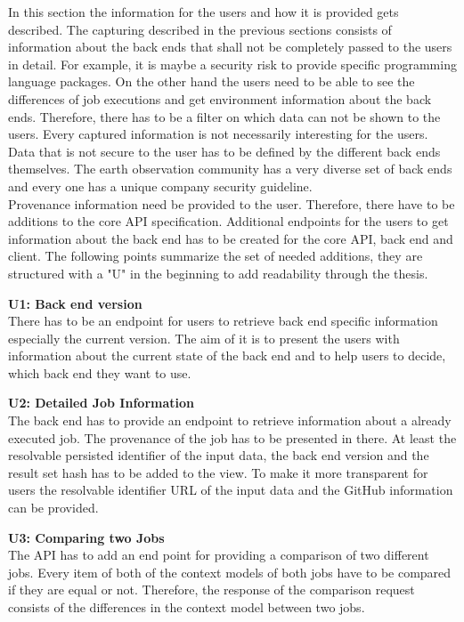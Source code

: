 \documentclass[draft,final]{vutinfth} %
\begin{document}
In this section the information for the users and how it is provided gets described. The capturing described in the previous sections consists of information about the back ends that shall not be completely passed to the users in detail. For example, it is maybe a security risk to provide specific programming language packages. On the other hand the users need to be able to see the differences of job executions and get environment information about the back ends. Therefore, there has to be a filter on which data can not be shown to the users. Every captured information is not necessarily interesting for the users. Data that is not secure to the user has to be defined by the different back ends themselves. The earth observation community has a very diverse set of back ends and every one has a unique company security guideline.\\ 
Provenance information need be provided to the user. Therefore, there have to be additions to the core API specification. Additional endpoints for the users to get information about the back end has to be created for the core API, back end and client. The following points summarize the set of needed additions, they are structured with a "U" in the beginning to add readability through the thesis. 

\textbf{U1: Back end version} \\
There has to be an endpoint for users to retrieve back end specific information especially the current version. The aim of it is to present the users with information about the current state of the back end and to help users to decide, which back end they want to use. 

\textbf{U2: Detailed Job Information} \\
The back end has to provide an endpoint to retrieve information about a already executed job. The provenance of the job has to be presented in there. At least the resolvable persisted identifier of the input data, the back end version and the result set hash has to be added to the view. To make it more transparent for users the resolvable identifier URL of the input data and the GitHub information can be provided.   

\textbf{U3: Comparing two Jobs} \\
The API has to add an end point for providing a comparison of two different jobs.  Every item of both of the context models of both jobs have to be compared if they are equal or not. Therefore, the response of the comparison request consists of the differences in the context model between two jobs.
\end{document}
